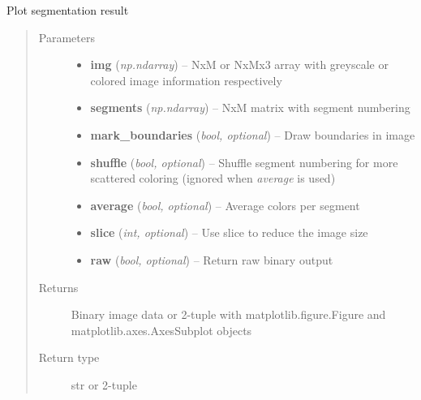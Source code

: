 \documentclass[letterpaper,10pt,english]{sphinxmanual}
\begin{document}
\begin{fulllineitems}
\label{segmentation:flamingo.segmentation.plot.plot}
Plot segmentation result
\begin{quote}\begin{description}
\item[{Parameters}] \leavevmode\begin{itemize}
\item {} 
\textbf{img} (\emph{np.ndarray}) -- NxM or NxMx3 array with greyscale or colored image information
respectively

\item {} 
\textbf{segments} (\emph{np.ndarray}) -- NxM matrix with segment numbering

\item {} 
\textbf{mark\_boundaries} (\emph{bool, optional}) -- Draw boundaries in image

\item {} 
\textbf{shuffle} (\emph{bool, optional}) -- Shuffle segment numbering for more scattered coloring (ignored
when \emph{average} is used)

\item {} 
\textbf{average} (\emph{bool, optional}) -- Average colors per segment

\item {} 
\textbf{slice} (\emph{int, optional}) -- Use slice to reduce the image size

\item {} 
\textbf{raw} (\emph{bool, optional}) -- Return raw binary output

\end{itemize}

\item[{Returns}] \leavevmode
Binary image data or 2-tuple with matplotlib.figure.Figure and
matplotlib.axes.AxesSubplot objects

\item[{Return type}] \leavevmode
str or 2-tuple

\end{description}\end{quote}

\end{fulllineitems}

\end{document}
